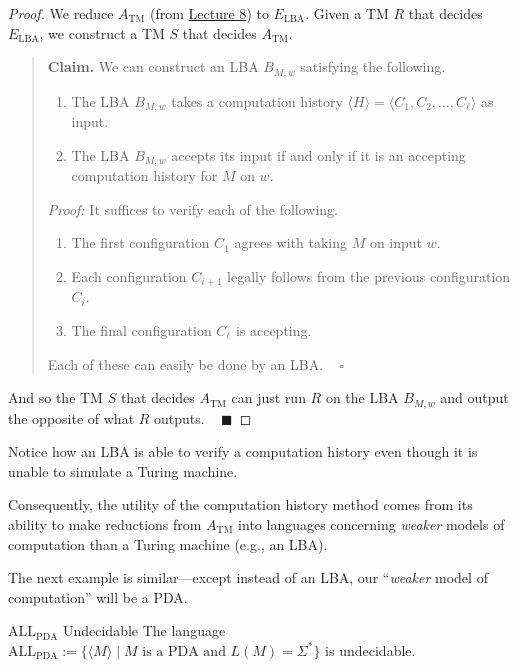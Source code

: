 \begin{proof}
    We reduce $A_{\mathrm{TM}}$
    (from \href{/18.404/lectures/8/#a-tm-undecidability}{Lecture 8})
    to $E_{\mathrm{LBA}}$.
    Given a TM $R$ that decides $E_{\mathrm{LBA}}$,
    we construct a TM $S$ that decides $A_{\mathrm{TM}}$.
    \begin{quote}
        \textbf{Claim.}
        We can construct an LBA $B_{M, w}$ satisfying the following.
        \begin{enumerate}
            \item The LBA $B_{M, w}$ takes a computation history
            $\langle H \rangle = \langle C_1, C_2, \dots, C_{\ell} \rangle$
            as input.
            \item The LBA $B_{M, w}$ accepts its input if and only if
            it is an accepting computation history for $M$ on $w$.
        \end{enumerate}

        \emph{Proof:}
        It suffices to verify each of the following.
        \begin{enumerate}
            \item The first configuration $C_1$
            agrees with taking $M$ on input $w$.
            \item Each configuration $C_{i + 1}$
            legally follows from the previous configuration $C_i$.
            \item The final configuration $C_{\ell}$
            is accepting.
        \end{enumerate}
        Each of these can easily be done by an LBA.
        ~ $\square$
    \end{quote}
    And so the TM $S$ that decides $A_{\mathrm{TM}}$
    can just run $R$ on the LBA $B_{M, w}$
    and output the opposite of what $R$ outputs.
    ~ $\blacksquare$
\end{proof}

Notice how an LBA is able to verify a computation history
even though it is unable to simulate a Turing machine.

Consequently, the utility of the computation history method
comes from its ability to make reductions from $A_{\mathrm{TM}}$
into languages concerning \emph{weaker} models of computation
than a Turing machine (e.g., an LBA).

The next example is similar---except instead of an LBA,
our ``\emph{weaker} model of computation'' will be a PDA.

\begin{theorem}{$\mathrm{ALL}_{\mathrm{PDA}}$ Undecidable}
    The language $\mathrm{ALL}_{\mathrm{PDA}} := \{
        \langle M \rangle \mid M \text{ is a PDA and } L(M) = \Sigma^*
    \}$ is undecidable.
\end{theorem}

